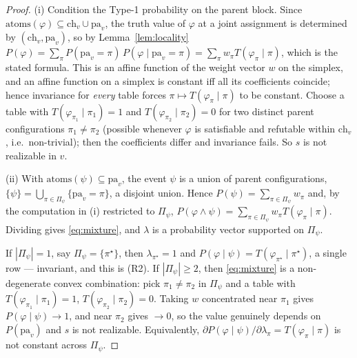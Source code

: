 \documentclass[11pt]{article}
\theoremstyle{definition}
\newcommand{\ch}{\mathrm{ch}}
\newcommand{\pa}{\mathrm{pa}}
\newcommand{\atoms}{\mathrm{atoms}}
\begin{document}
\begin{proof}
(i) Condition the Type-1 probability on the parent block. Since
$\atoms(\varphi)\subseteq\ch_v\cup\pa_v$, the truth value of $\varphi$ at a joint assignment is
determined by $(\ch_v,\pa_v)$, so by Lemma~\ref{lem:locality}
$P(\varphi)=\sum_\pi P(\pa_v{=}\pi)\,P(\varphi\mid\pa_v{=}\pi)=\sum_\pi w_\pi T(\varphi_\pi\mid\pi)$,
which is the stated formula. This is an affine function of the weight vector $w$ on the simplex, and
an affine function on a simplex is constant iff all its coefficients coincide; hence invariance for
\emph{every} table forces $\pi\mapsto T(\varphi_\pi\mid\pi)$ to be constant. Choose a table with
$T(\varphi_{\pi_1}\mid\pi_1)=1$ and $T(\varphi_{\pi_2}\mid\pi_2)=0$ for two distinct parent
configurations $\pi_1\ne\pi_2$ (possible whenever $\varphi$ is satisfiable and refutable within
$\ch_v$, i.e.\ non-trivial); then the coefficients differ and invariance fails. So $s$ is not
realizable in $v$.

(ii) With $\atoms(\psi)\subseteq\pa_v$, the event $\psi$ is a union of parent configurations,
$\{\psi\}=\bigcup_{\pi\in\Pi_\psi}\{\pa_v{=}\pi\}$, a disjoint union. Hence
$P(\psi)=\sum_{\pi\in\Pi_\psi}w_\pi$ and, by the computation in (i) restricted to $\Pi_\psi$,
$P(\varphi\wedge\psi)=\sum_{\pi\in\Pi_\psi}w_\pi T(\varphi_\pi\mid\pi)$. Dividing gives
\eqref{eq:mixture}, and $\lambda$ is a probability vector supported on $\Pi_\psi$.

If $|\Pi_\psi|=1$, say $\Pi_\psi=\{\pi^\star\}$, then $\lambda_{\pi^\star}=1$ and
$P(\varphi\mid\psi)=T(\varphi_{\pi^\star}\mid\pi^\star)$, a single row --- invariant, and this is
(R2). If $|\Pi_\psi|\ge2$, then \eqref{eq:mixture} is a non-degenerate convex combination: pick
$\pi_1\ne\pi_2$ in $\Pi_\psi$ and a table with $T(\varphi_{\pi_1}\mid\pi_1)=1$,
$T(\varphi_{\pi_2}\mid\pi_2)=0$. Taking $w$ concentrated near $\pi_1$ gives
$P(\varphi\mid\psi)\to1$, and near $\pi_2$ gives $\to0$, so the value genuinely depends on
$P(\pa_v)$ and $s$ is not realizable. Equivalently, $\partial P(\varphi\mid\psi)/\partial\lambda_\pi
=T(\varphi_\pi\mid\pi)$ is not constant across $\Pi_\psi$.
\end{proof}
\end{document}
